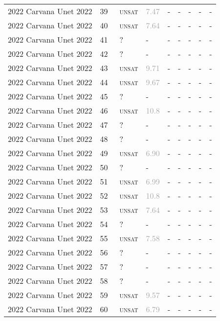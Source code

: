 \begin{center}
{\begin{longtable}{@{}lllllllll@{}}
2022 Carvana Unet 2022 & 39 & ~\textsc{unsat} & \textcolor{darkgray}{7.47} & - & - & - & - & - \\
2022 Carvana Unet 2022 & 40 & ~\textsc{unsat} & \textcolor{darkgray}{7.64} & - & - & - & - & - \\
2022 Carvana Unet 2022 & 41 & ~? & - & - & - & - & - & - \\
2022 Carvana Unet 2022 & 42 & ~? & - & - & - & - & - & - \\
2022 Carvana Unet 2022 & 43 & ~\textsc{unsat} & \textcolor{darkgray}{9.71} & - & - & - & - & - \\
2022 Carvana Unet 2022 & 44 & ~\textsc{unsat} & \textcolor{darkgray}{9.67} & - & - & - & - & - \\
2022 Carvana Unet 2022 & 45 & ~? & - & - & - & - & - & - \\
2022 Carvana Unet 2022 & 46 & ~\textsc{unsat} & \textcolor{darkgray}{10.8} & - & - & - & - & - \\
2022 Carvana Unet 2022 & 47 & ~? & - & - & - & - & - & - \\
2022 Carvana Unet 2022 & 48 & ~? & - & - & - & - & - & - \\
2022 Carvana Unet 2022 & 49 & ~\textsc{unsat} & \textcolor{darkgray}{6.90} & - & - & - & - & - \\
2022 Carvana Unet 2022 & 50 & ~? & - & - & - & - & - & - \\
2022 Carvana Unet 2022 & 51 & ~\textsc{unsat} & \textcolor{darkgray}{6.99} & - & - & - & - & - \\
2022 Carvana Unet 2022 & 52 & ~\textsc{unsat} & \textcolor{darkgray}{10.8} & - & - & - & - & - \\
2022 Carvana Unet 2022 & 53 & ~\textsc{unsat} & \textcolor{darkgray}{7.64} & - & - & - & - & - \\
2022 Carvana Unet 2022 & 54 & ~? & - & - & - & - & - & - \\
2022 Carvana Unet 2022 & 55 & ~\textsc{unsat} & \textcolor{darkgray}{7.58} & - & - & - & - & - \\
2022 Carvana Unet 2022 & 56 & ~? & - & - & - & - & - & - \\
2022 Carvana Unet 2022 & 57 & ~? & - & - & - & - & - & - \\
2022 Carvana Unet 2022 & 58 & ~? & - & - & - & - & - & - \\
2022 Carvana Unet 2022 & 59 & ~\textsc{unsat} & \textcolor{darkgray}{9.57} & - & - & - & - & - \\
2022 Carvana Unet 2022 & 60 & ~\textsc{unsat} & \textcolor{darkgray}{6.79} & - & - & - & - & - \\

\end{longtable}}
\end{center}
